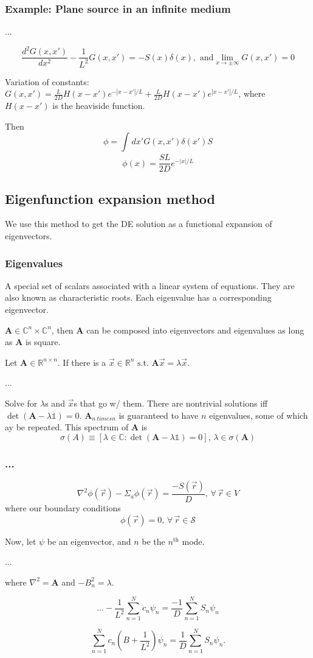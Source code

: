 \documentclass{report}
\newcommand{\hh}[1]{\subsection*{#1}}
\newcommand{\hhh}[1]{\subsubsection*{#1}}
\newcommand{\Xs}{\Sigma}
\newcommand{\pos}{\vec{r}}
\newcommand{\oneDgreens}{G(x,x')}
\begin{document}
\hhh{Example: Plane source in an infinite medium}

...

$$\frac{d^2 \oneDgreens}{dx^2} - \frac{1}{L^2} \oneDgreens = -S(x)\delta(x), \text{ and} \lim_{x\rightarrow\pm\infty} \oneDgreens = 0$$

Variation of constants: $\oneDgreens = \frac{L}{2D}H(x-x')e^{-|x-x'|/L} + \frac{L}{2D}H(x-x')e^{|x-x'|/L}$, where $H(x-x')$ is the heaviside function.

Then 
$$ \phi = \int_{}^{}dx' \oneDgreens \delta(x') S $$
$$ \phi(x) = \frac{SL}{2D}e^{-|x|/L} $$

\hh{Eigenfunction expansion method}
We use this method to get the DE solution as a functional expansion of eigenvectors.

\hhh{Eigenvalues}
A special set of scalars associated with a linear system of equations. They are also known as characteristic roots. Each eigenvalue has a corresponding eigenvector. 

$\mathbf{A} \in \mathbb{C}^n \times \mathbb{C}^n$, then $\mathbf{A}$ can be composed into eigenvectors and eigenvalues as long as $\mathbf{A}$ is square.

Let $\mathbf{A} \in \mathbb{R}^{n \times n}.$ If there is a $\vec{x} \in \mathbb{R}^n \text{ s.t. } \mathbf{A}\vec{x} = \lambda\vec{x}$.

...

Solve for $\lambda$s and $\vec{x}$s that go w/ them. There are nontrivial solutions iff $\det(\mathbf{A} - \lambda\mathbb{1}) = 0$. $\mathbf{A}_{n\ times n}$ is guaranteed to have $n$ eigenvalues, some of which ay be repeated. This spectrum of $\mathbf{A}$ is 
$$ \sigma(A) \equiv \left[ \lambda \in \mathbb{C} : \det(\mathbf{A}-\lambda\mathbb{1}) = 0 \right], \, \lambda \in \sigma(\mathbf{A}) $$

\hhh{...}
$$ \nabla^2 \phi(\pos) - \Xs_a \phi(\pos) = \frac{-S(\pos)}{D}, \, \forall \, \pos \in V $$
where our boundary conditions 
$$ \phi(\pos) = 0, \, \forall \, \pos \in \mathcal{S} $$

Now, let $\psi$ be an eigenvector, and $n$ be the $n^{\text{th}}$ mode.


...

where $\nabla^2 = \mathbf{A}$ and $-B_n^2 = \lambda$.

$$ ... - \frac{1}{L^2}\sum_{n=1}^N c_n \psi_n = \frac{-1}{D}\sum_{n=1}^{N} S_n \psi_n $$


$$ \sum_{n=1}^N c_n \left(B + \frac{1}{L^2}\right) \psi_n = \frac{1}{D}\sum_{n=1}^N S_n \psi_n .$$
\end{document}
